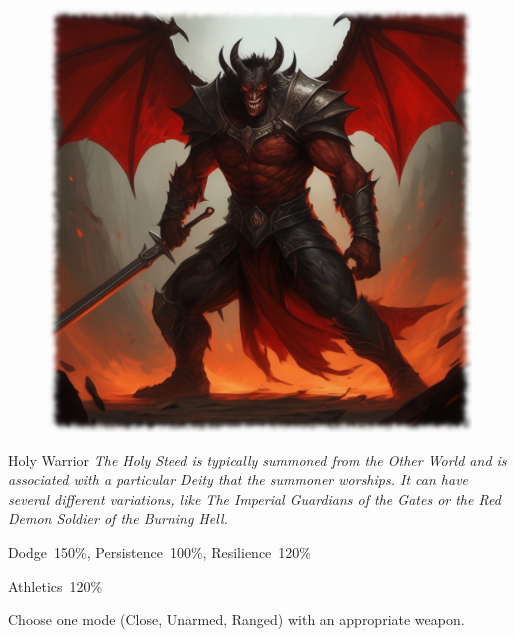 
\begin{figure}[h]
\begin{center}
\includegraphics[scale=0.24]{img/ai-images/demon.png}
\end{center}
\end{figure}
\begin{monsterbox}{Holy Warrior}
	\label{monster:holy-warrior}
	\textit{The Holy Steed is typically summoned from the Other World and is associated with a particular Deity that the summoner worships. It can have several different variations, like The Imperial Guardians of the Gates or the Red Demon Soldier of the Burning Hell.}\\
	\rpghline
	\basics[%
        hitpoints  = 18,
	majorwound = 9,
	damagemodifier = +1D6,
	powerpoints = 18,
	movementrate = 12m,
	armor = Special (6AP),
	plunderrating = 0
	]
	\rpghline%
	\stats[ %
		STR = 20,
		CON = 18,
		DEX = 15,
		SIZ = 18,
		INT = 15,
		POW = 18,
		CHA = 18
	]
	\rpghline%
	\begin{rpg-monsteraction}[Resistances]
		Dodge~150\%, Persistence~100\%, Resilience~120\%
	\end{rpg-monsteraction}
	\begin{rpg-monsteraction}[Practical]
		Athletics~120\%
	\end{rpg-monsteraction}
	\begin{rpg-monsteraction}[Combat 150\%]
		Choose one mode (Close, Unarmed, Ranged) with an appropriate weapon.
	\end{rpg-monsteraction}
\end{monsterbox}

